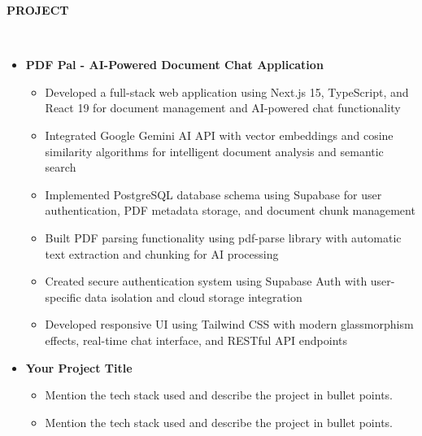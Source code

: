 \documentclass[11pt,article]{article}
\newcommand{\resheading}[1]{{\small \colorbox{mygrey} { \begin{minipage}{0.99\textwidth}{\textbf{#1 \vphantom{p\^{E}}}}\end{minipage}}}}
\begin{document}
\noindent
\resheading{\textbf{PROJECT} }\\[-0.35cm]
\vspace{-0.4em}
\begin{itemize}[noitemsep]
\item \textbf{PDF Pal - AI-Powered Document Chat Application}
\vspace{-0.25em}
\begin{itemize}[noitemsep]
    \item Developed a full-stack web application using Next.js 15, TypeScript, and React 19 for document management and AI-powered chat functionality
    \item Integrated Google Gemini AI API with vector embeddings and cosine similarity algorithms for intelligent document analysis and semantic search
    \item Implemented PostgreSQL database schema using Supabase for user authentication, PDF metadata storage, and document chunk management
    \item Built PDF parsing functionality using pdf-parse library with automatic text extraction and chunking for AI processing
    \item Created secure authentication system using Supabase Auth with user-specific data isolation and cloud storage integration
    \item Developed responsive UI using Tailwind CSS with modern glassmorphism effects, real-time chat interface, and RESTful API endpoints
\end{itemize}
\item \textbf{Your Project Title}
\vspace{-0.25em}
\begin{itemize}[noitemsep]
    \item Mention the tech stack used and describe the project in bullet points.
    \item Mention the tech stack used and describe the project in bullet points.
\end{itemize}
\end{itemize}
\end{document}
